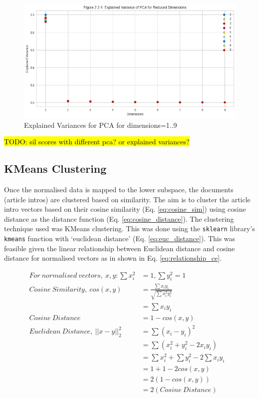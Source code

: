 \begin{figure}[H]
  \centering
  \includegraphics[scale=0.3]{images/explained variances.png}
  \caption{Explained Variances for PCA for dimensions=1..9 }
  \label{fig:pca}
\end{figure}

\hl{TODO: sil scores with different pca? or explained variances?} 

\subsection{KMeans Clustering}
Once the normalised data is mapped to the lower subspace, the documents (article intros) are clustered based on similarity. The aim is to cluster the article intro vectors based on their cosine similarity (Eq. \ref{eq:cosine_sim}) using cosine distance as the distance function (Eq. \ref{eq:cosine_distance}). The clustering technique used was KMeans clustering. This was done using the \texttt{sklearn} library's \texttt{kmeans} function with `euclidean distance' (Eq. \ref{eq:euc_distance}). This was feasible given the linear relationship between Euclidean distance and  cosine distance \cite{kmeans} for normalised vectors as in shown in Eq. \ref{eq:relationship_ce}.


\begin{align}
  \mathit{For \ normalised \ vectors,} \ x, y:  \sum x_i^2 &= 1,  \sum y_i^2 = 1 \label{eq:normalised} &\\ 
  \mathit{Cosine \ Similarity,} \ cos(x, y) &= \frac{\sum x_i y_i}{\sqrt{\sum x_i^2 y_i^2}}  \nonumber &\\ 
   &= \sum x_i y_i \label{eq:cosine_sim} &\\
   \mathit{Cosine \ Distance} &= 1 - cos(x, y) \label{eq:cosine_distance} &\\
   \mathit{Euclidean \ Distance,} \ || x - y ||_2^2  &= \sum (x_i -  y_i)^2  \label{eq:euc_distance} &\\
                 &= \sum (x_i^2 + y_i^2 - 2 x_i y_i)  \nonumber &\\
                 &= \sum x_i^2 + \sum y_i^2 - 2\sum x_i y_i   \nonumber &\\
                 &= 1 + 1 - 2 cos(x, y)  \nonumber &\\
                 &= 2 (1 - cos(x, y))  &\\
                 &= 2 (\mathit{Cosine \ Distance}) \label{eq:relationship_ce}
\end{align}


